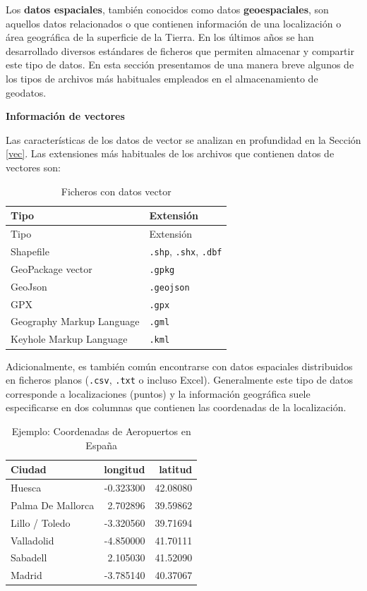 \documentclass[
]{book}
\theoremstyle{definition}
\theoremstyle{definition}
\theoremstyle{definition}
\theoremstyle{definition}
\theoremstyle{remark}
\begin{document}
Los \textbf{datos espaciales}, también conocidos como datos \textbf{geoespaciales}, son
aquellos datos relacionados o que contienen información de una localización o
área geográfica de la superficie de la Tierra. En los últimos años se han
desarrollado diversos estándares de ficheros que permiten almacenar y compartir
este tipo de datos. En esta sección presentamos de una manera breve algunos de
los tipos de archivos más habituales empleados en el almacenamiento de geodatos.

\textbf{Información de vectores}

Las características de los datos de vector se analizan en profundidad en la
Sección \ref{vec}. Las extensiones más habituales de los archivos que contienen
datos de vectores son:

\begin{longtable}[]{@{}ll@{}}
\caption{Ficheros con datos vector}\tabularnewline
\toprule
Tipo & Extensión \\
\midrule
\endfirsthead
\toprule
Tipo & Extensión \\
\midrule
\endhead
Shapefile & \texttt{.shp}, \texttt{.shx}, \texttt{.dbf} \\
GeoPackage vector & \texttt{.gpkg} \\
GeoJson & \texttt{.geojson} \\
GPX & \texttt{.gpx} \\
Geography Markup Language & \texttt{.gml} \\
Keyhole Markup Language & \texttt{.kml} \\
\bottomrule
\end{longtable}

Adicionalmente, es también común encontrarse con datos espaciales distribuidos
en ficheros planos (\texttt{.csv}, \texttt{.txt} o incluso Excel). Generalmente este tipo de
datos corresponde a localizaciones (puntos) y la información geográfica suele
especificarse en dos columnas que contienen las coordenadas de la localización.

\begin{table}

\caption{\label{tab:unnamed-chunk-7}Ejemplo: Coordenadas de Aeropuertos en España}
\centering
\begin{tabular}[t]{l|r|r}
\hline
Ciudad & longitud & latitud\\
\hline
Huesca & -0.323300 & 42.08080\\
\hline
Palma De Mallorca & 2.702896 & 39.59862\\
\hline
Lillo / Toledo & -3.320560 & 39.71694\\
\hline
Valladolid & -4.850000 & 41.70111\\
\hline
Sabadell & 2.105030 & 41.52090\\
\hline
Madrid & -3.785140 & 40.37067\\
\hline
\end{tabular}
\end{table}
\end{document}
